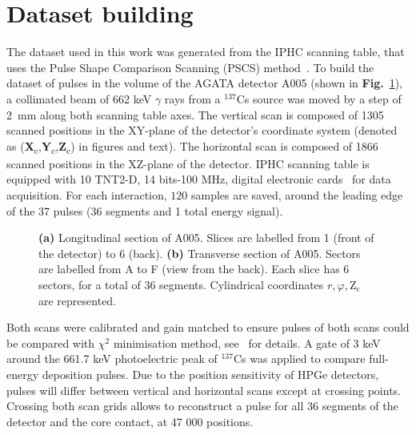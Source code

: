 \section{Dataset building}
\label{sec:dataset_building}
The dataset used in this work was generated from the IPHC scanning table, that uses the Pulse Shape Comparison Scanning (PSCS) method~\cite{Crespi2008}. To build the dataset of pulses in the volume of the AGATA detector A005 (shown in \textbf{Fig.}~\ref{fig:a005_geometry}), a collimated beam of 662 keV $\gamma$ rays from a $^{137}$Cs source was moved by a step of 2~mm along both scanning table axes. The vertical scan is composed of 1305 scanned positions in the XY-plane of the detector's coordinate system (denoted as (\textbf{X}\textsubscript{c},\textbf{Y}\textsubscript{c},\textbf{Z}\textsubscript{c}) in figures and text). The horizontal scan is composed of 1866 scanned positions in the XZ-plane of the detector. IPHC scanning table is equipped with 10 TNT2-D, 14 bits-100 MHz, digital electronic cards~\cite{Arnold2005} for data acquisition. For each interaction, $120$ samples are saved, around the leading edge of the 37 pulses (36 segments and 1 total energy signal).

\begin{figure}
\centering
{}
\caption{\textbf{(a)} Longitudinal section of A005. Slices are labelled from 1 (front of the detector) to 6 (back). \textbf{(b)} Transverse section of A005. Sectors are labelled from A to F (view from the back). Each slice has 6 sectors, for a total of 36 segments. Cylindrical coordinates $r, \varphi, \text{Z}_\text{c}$ are represented. }
\label{fig:a005_geometry}
\end{figure}

Both scans were calibrated and gain matched to ensure pulses of both scans could be compared with $\chi^2$ minimisation method, see~\cite{DeCanditiis2020SimulationsDetector} for details. A gate of 3 keV around the 661.7 keV photoelectric peak of $^{137}$Cs was applied to compare full-energy deposition pulses. Due to the position sensitivity of HPGe detectors, pulses will differ between vertical and horizontal scans except at crossing points. Crossing both scan grids allows to reconstruct a pulse for all 36 segments of the detector and the core contact, at 47 000 positions. 

